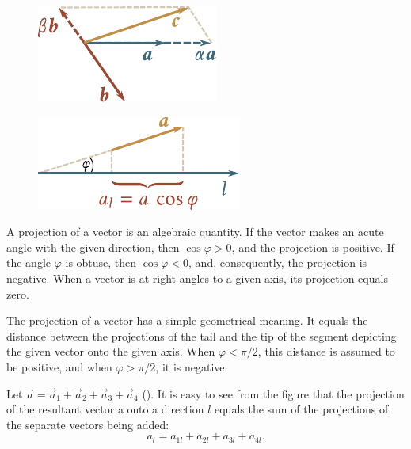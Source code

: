 \begin{figure}[t]
	\begin{minipage}[t]{0.5\linewidth}
		\begin{center}
			\includegraphics[scale=1]{figures/ch_01/fig_1_9.pdf}
			\caption[]{}
			\label{fig:1_9}
		\end{center}
	\end{minipage}
	\hfill{ }%
	\begin{minipage}[t]{0.5\linewidth}
		\begin{center}
			\includegraphics[scale=0.95]{figures/ch_01/fig_1_10.pdf}
			\caption[]{}
			\label{fig:1_10}
		\end{center}
	\end{minipage}
	\vspace{-0.7cm}
\end{figure}

A projection of a vector is an algebraic quantity. If the vector makes an acute angle with the given direction, then $\cos\varphi>0$, and the projection is positive. If the angle $\varphi$ is obtuse, then $\cos\varphi<0$, and, consequently, the projection is negative. When a vector is at right angles to a given axis, its projection equals zero.

The projection of a vector has a simple geometrical meaning. It equals the distance between the projections of the tail and the tip of the segment depicting the given vector onto the given axis. When $\varphi<\pi/2$, this distance is assumed to be positive, and when $\varphi>\pi/2$, it is negative.

Let $\vec{a} = \vec{a}_1+\vec{a}_2+\vec{a}_3+\vec{a}_4$ (). It is easy to see from the figure that the projection of the resultant vector a onto a direction $l$ equals the sum of the projections of the separate vectors being added:
\begin{equation}\label{eq:1_8}
a_l = a_{1l}+a_{2l}+a_{3l}+a_{4l}.
\end{equation}

